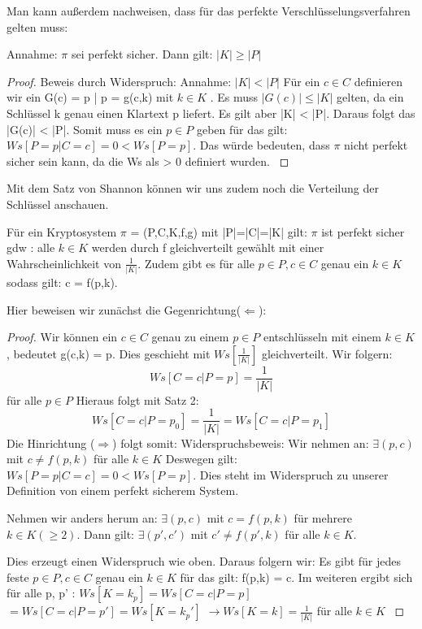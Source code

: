 \documentclass[
10pt, %
a4paper, %
oneside, %
headinclude,footinclude, %
BCOR5mm, %
]{scrartcl}
\begin{document}
	Man kann außerdem nachweisen, dass für das perfekte Verschlüsselungsverfahren gelten muss: 
	\begin{theorem}
	Annahme: $\pi$ sei perfekt sicher. Dann gilt: $|K| \ge |P| $
	\end{theorem}
	\begin{proof}
	Beweis durch Widerspruch: 
	Annahme: $|K| < |P| $
	Für ein $c \in C$ definieren wir ein G(c) = {p | p = g(c,k) mit $k \in K$ }.
	Es muss $|G(c)| \le |K|$ gelten, da ein Schlüssel k genau einen Klartext p liefert.  
	Es gilt aber |K| < |P|. Daraus folgt das |G(c)| < |P|. Somit muss es ein $p \in P$ geben für das gilt: $Ws[\textit{P} = p | \textit{C} = c] = 0 < Ws[\textit{P} = p] $.
	Das würde bedeuten, dass $\pi$ nicht perfekt sicher sein kann, da die Ws als > 0 definiert wurden. \cite[Seite 8]{11}
	\end{proof}
	Mit dem Satz von Shannon können wir uns zudem noch die Verteilung der Schlüssel anschauen. 
	\begin{theorem} 
	[Shannon]
	Für ein Kryptosystem $\pi$ = (P,C,K,f,g) mit |P|=|C|=|K| gilt: $\pi$ ist perfekt sicher gdw : alle $k \in K$ werden durch f gleichverteilt gewählt mit einer Wahrscheinlichkeit von $ \frac{1}{|K|} $. Zudem gibt es für alle $p \in P, c \in C$ genau ein $k \in K $ sodass gilt: c = f(p,k).
	\end{theorem}
	Hier beweisen wir zunächst die Gegenrichtung($\Leftarrow$): 
	\begin{proof}
	Wir können ein $ c \in C$ genau zu einem $p \in P$ entschlüsseln mit einem $k \in K $, bedeutet g(c,k) = p. Dies geschieht mit $Ws[\frac{1}{|K|}] $ gleichverteilt. Wir folgern: 
	$$Ws[\textit{C} = c | \textit{P} = p] = \frac{1}{|K|}$$ für alle $p \in P$ 
	Hieraus folgt mit Satz 2: 
	$$Ws[\textit{C} = c | \textit{P} = p_0] = \frac{1}{|K|} = Ws[\textit{C} = c | \textit{P} = p_1]$$
	Die Hinrichtung ($\Rightarrow$) folgt somit:
	Widerspruchsbeweis:
	Wir nehmen an: $\exists (p,c)$ mit $c \ne f(p,k)$ für alle $k \in K $
	Deswegen gilt: $Ws[\textit{P} = p | \textit{C} = c] = 0 < Ws[\textit{P} = p]$. Dies steht im Widerspruch zu unserer Definition von einem perfekt sicherem System.
	
	Nehmen wir anders herum an: $\exists (p,c)$ mit $c = f(p,k)$ für mehrere $k \in K (\ge 2) $.
	Dann gilt: $\exists (p',c')$ mit $c' \ne f(p',k)$ für alle $k \in K $.
 
	Dies erzeugt einen Widerspruch wie oben. 
	Daraus folgern wir: Es gibt für jedes feste $p \in P, c \in C$ genau ein $k \in K$ für das gilt: f(p,k) = c. 
	Im weiteren ergibt sich für alle p, p' : 
	$Ws[\textit{K} = k_p] = Ws[\textit{C} = c | \textit{P} = p]$
	$ = Ws[\textit{C} = c | \textit{P} = p'] = Ws[\textit{K} = k_p']$
	$\rightarrow Ws[\textit{K} = k ] = \frac{1}{|K|}$ für alle $k \in K $ \cite[Seite 9]{11}
	\end{proof}
\end{document}
